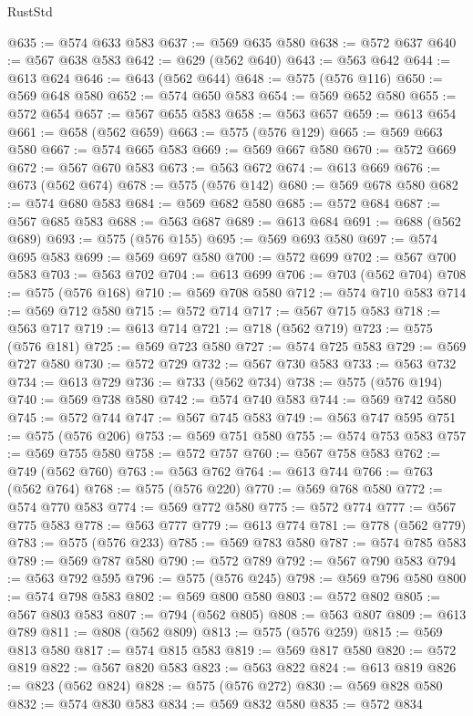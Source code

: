 \begin{lexlean}{RustStd}
\begin{coremodule}
@635 := @574 @633 @583
@637 := @569 @635 @580
@638 := @572 @637
@640 := @567 @638 @583
@642 := @629 (@562 @640)
@643 := @563 @642
@644 := @613 @624
@646 := @643 (@562 @644)
@648 := @575 (@576 @116)
@650 := @569 @648 @580
@652 := @574 @650 @583
@654 := @569 @652 @580
@655 := @572 @654
@657 := @567 @655 @583
@658 := @563 @657
@659 := @613 @654
@661 := @658 (@562 @659)
@663 := @575 (@576 @129)
@665 := @569 @663 @580
@667 := @574 @665 @583
@669 := @569 @667 @580
@670 := @572 @669
@672 := @567 @670 @583
@673 := @563 @672
@674 := @613 @669
@676 := @673 (@562 @674)
@678 := @575 (@576 @142)
@680 := @569 @678 @580
@682 := @574 @680 @583
@684 := @569 @682 @580
@685 := @572 @684
@687 := @567 @685 @583
@688 := @563 @687
@689 := @613 @684
@691 := @688 (@562 @689)
@693 := @575 (@576 @155)
@695 := @569 @693 @580
@697 := @574 @695 @583
@699 := @569 @697 @580
@700 := @572 @699
@702 := @567 @700 @583
@703 := @563 @702
@704 := @613 @699
@706 := @703 (@562 @704)
@708 := @575 (@576 @168)
@710 := @569 @708 @580
@712 := @574 @710 @583
@714 := @569 @712 @580
@715 := @572 @714
@717 := @567 @715 @583
@718 := @563 @717
@719 := @613 @714
@721 := @718 (@562 @719)
@723 := @575 (@576 @181)
@725 := @569 @723 @580
@727 := @574 @725 @583
@729 := @569 @727 @580
@730 := @572 @729
@732 := @567 @730 @583
@733 := @563 @732
@734 := @613 @729
@736 := @733 (@562 @734)
@738 := @575 (@576 @194)
@740 := @569 @738 @580
@742 := @574 @740 @583
@744 := @569 @742 @580
@745 := @572 @744
@747 := @567 @745 @583
@749 := @563 @747 @595
@751 := @575 (@576 @206)
@753 := @569 @751 @580
@755 := @574 @753 @583
@757 := @569 @755 @580
@758 := @572 @757
@760 := @567 @758 @583
@762 := @749 (@562 @760)
@763 := @563 @762
@764 := @613 @744
@766 := @763 (@562 @764)
@768 := @575 (@576 @220)
@770 := @569 @768 @580
@772 := @574 @770 @583
@774 := @569 @772 @580
@775 := @572 @774
@777 := @567 @775 @583
@778 := @563 @777
@779 := @613 @774
@781 := @778 (@562 @779)
@783 := @575 (@576 @233)
@785 := @569 @783 @580
@787 := @574 @785 @583
@789 := @569 @787 @580
@790 := @572 @789
@792 := @567 @790 @583
@794 := @563 @792 @595
@796 := @575 (@576 @245)
@798 := @569 @796 @580
@800 := @574 @798 @583
@802 := @569 @800 @580
@803 := @572 @802
@805 := @567 @803 @583
@807 := @794 (@562 @805)
@808 := @563 @807
@809 := @613 @789
@811 := @808 (@562 @809)
@813 := @575 (@576 @259)
@815 := @569 @813 @580
@817 := @574 @815 @583
@819 := @569 @817 @580
@820 := @572 @819
@822 := @567 @820 @583
@823 := @563 @822
@824 := @613 @819
@826 := @823 (@562 @824)
@828 := @575 (@576 @272)
@830 := @569 @828 @580
@832 := @574 @830 @583
@834 := @569 @832 @580
@835 := @572 @834

\end{coremodule}
\end{lexlean}

